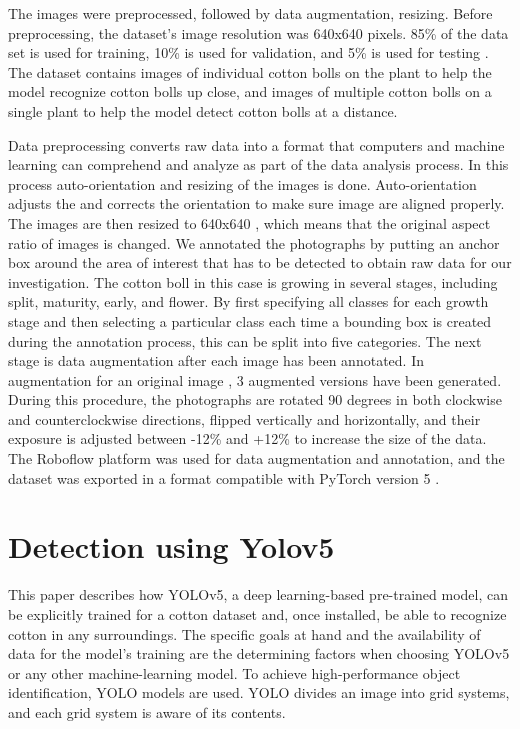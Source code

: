 \documentclass[12pt,a4paper]{report}
\begin{document}
\par The images were preprocessed, followed by data augmentation, resizing. Before preprocessing, the dataset's image resolution was 640x640 pixels. 85\% of the data set is used for training, 10\% is used for validation, and 5\% is used for testing \cite{r27}. The dataset contains images of individual cotton bolls on the plant to help the model recognize cotton bolls up close, and images of multiple cotton bolls on a single plant to help the model detect cotton bolls at a distance.
\par Data preprocessing converts raw data into a format that computers and machine learning can comprehend and analyze as part of the data analysis process. In this process auto-orientation and resizing of the images is done. Auto-orientation adjusts the and corrects the orientation to make sure image are aligned properly. The images are then resized to 640x640 , which means that the original aspect ratio of images is changed. We annotated the photographs by putting an anchor box around the area of interest that has to be detected to obtain raw data for our investigation. The cotton boll in this case is growing in several stages, including split, maturity, early, and flower. By first specifying all classes for each growth stage and then selecting a particular class each time a bounding box is created during the annotation process, this can be split into five categories. The next stage is data augmentation after each image has been annotated. In augmentation for an original image , 3 augmented versions have been generated. During this procedure, the photographs are rotated 90 degrees in both clockwise and counterclockwise directions, flipped vertically and horizontally, and their exposure is adjusted between -12\% and +12\% to increase the size of the data. The Roboflow platform was used for data augmentation and annotation, and the dataset was exported in a format compatible with PyTorch version 5 \cite{r27}. 







\section {Detection using Yolov5}
\par \hspace*{0.2in}This paper describes how YOLOv5, a deep learning-based pre-trained model, can be explicitly trained for a cotton dataset and, once installed, be able to recognize cotton in any surroundings. The specific goals at hand and the availability of data for the model's training are the determining factors when choosing YOLOv5 or any other machine-learning model. To achieve high-performance object identification, YOLO models are used. YOLO divides an image into grid systems, and each grid system is aware of its contents.
\end{document}
